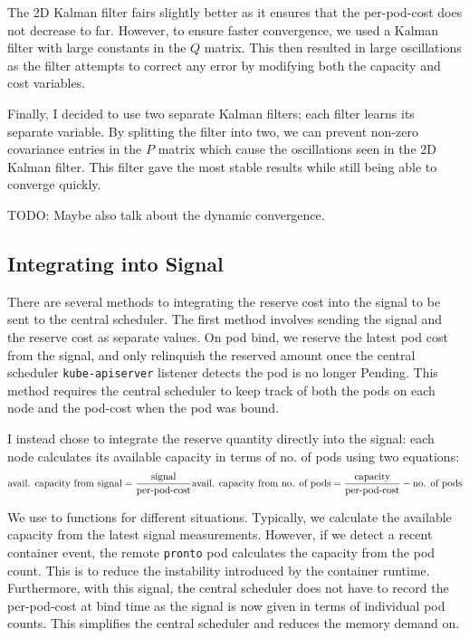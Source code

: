 The 2D Kalman filter fairs slightly better as it ensures that the per-pod-cost
does not decrease to far. However, to ensure faster convergence, we used a
Kalman filter with large constants in the $Q$ matrix. This then resulted in
large oscillations as the filter attempts to correct any error by modifying both
the capacity and cost variables.

Finally, I decided to use two separate Kalman filters; each filter learns its
separate variable. By splitting the filter into two, we can prevent non-zero
covariance entries in the $P$ matrix which cause the oscillations seen in the 2D
Kalman filter. This filter gave the most stable results while still being able
to converge quickly.

TODO: Maybe also talk about the dynamic convergence.

\subsection{Integrating into Signal}

There are several methods to integrating the reserve cost into the signal to be
sent to the central scheduler. The first method involves sending the signal and
the reserve cost as separate values. On pod bind, we reserve the latest pod cost
from the signal, and only relinquish the reserved amount once the central
scheduler \verb|kube-apiserver| listener detects the pod is no longer Pending.
This method requires the central scheduler to keep track of both the pods on
each node and the pod-cost when the pod was bound.

I instead chose to integrate the reserve quantity directly into the signal: each
node calculates its available capacity in terms of no. of pods using two equations:
\[ \text{avail. capacity from signal} = \frac{\text{signal}}{\text{per-pod-cost}} \\
   \text{avail. capacity from no. of pods} = \frac{\text{capacity}}{\text{per-pod-cost}} -
   \text{no. of pods} \]

We use to functions for different situations. Typically, we calculate the
available capacity from the latest signal measurements. However, if we detect a
recent container event, the remote \verb|pronto| pod calculates the capacity
from the pod count. This is to reduce the instability introduced by the
container runtime. Furthermore, with this signal, the central scheduler does not
have to record the per-pod-cost at bind time as the signal is now given in terms
of individual pod counts. This simplifies the central scheduler and reduces the
memory demand on.


